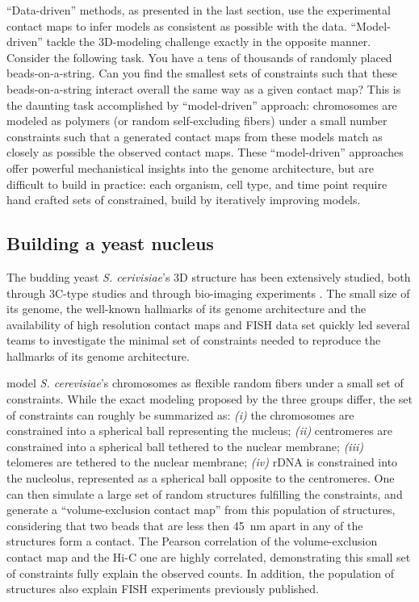 \documentclass[2columns]{article}
\begin{document}
``Data-driven'' methods, as presented in the last section, use the
experimental contact maps to infer models as consistent as possible with the
data. ``Model-driven'' tackle the 3D-modeling challenge exactly in the
opposite manner. Consider the following task. You have a tens of thousands of
randomly placed beads-on-a-string. Can you find the smallest sets of
constraints such that these beads-on-a-string interact overall the same way as
a given contact map? This is the daunting task accomplished by
``model-driven'' approach: chromosomes are modeled as polymers (or random
self-excluding fibers) under a small number constraints such that a generated
contact maps from these models match as closely as possible the observed
contact maps. These ``model-driven'' approaches offer powerful mechanistical
insights into the genome architecture, but are difficult to build in practice:
each organism, cell type, and time point require hand crafted sets of
constrained, build by iteratively improving models.

\subsection*{Building a yeast nucleus}

The budding yeast \textit{S. cerivisiae}'s 3D structure has been extensively
studied, both through 3C-type studies \citep{dekker:capturing,
duan:three-dimensional, burton:species-level} and through bio-imaging experiments
\citep{berger:high}. The small size of its genome, the well-known hallmarks of its
genome architecture and the availability of high resolution contact maps and
FISH data set quickly led several teams to investigate the minimal set of
constraints needed to reproduce the hallmarks of its genome architecture.

\cite{tjong:physical, tokuda:dynamical, tjong:physical} model {\em S.
cerevisiae}'s chromosomes as flexible random fibers under a small set of
constraints. While the exact modeling proposed by the three groups differ, the
set of constraints can roughly be summarized as: \textit{(i)} the chromosomes
are constrained into a spherical ball representing the nucleus; \textit{(ii)}
centromeres are constrained into a spherical ball tethered to the nuclear
membrane; \textit{(iii)} telomeres are tethered to the nuclear membrane;
\textit{(iv)} rDNA is constrained into the nucleolus, represented as a
spherical ball opposite to the centromeres. One can then simulate a large set
of random structures fulfilling the constraints, and generate a
``volume-exclusion contact map'' from this population of structures,
considering that two beads that are less then 45~nm apart in any of the
structures form a contact. The Pearson correlation of the volume-exclusion
contact map and the Hi-C one are highly correlated, demonstrating this small
set of constraints fully explain the observed counts. In addition, the
population of structures also explain FISH experiments previously published.
\end{document}
